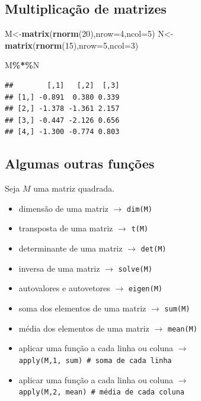 \documentclass[
]{book}
\newenvironment{Shaded}{\begin{snugshade}}{\end{snugshade}}
\newcommand{\AttributeTok}[1]{\textcolor[rgb]{0.13,0.29,0.53}{#1}}
\newcommand{\DecValTok}[1]{\textcolor[rgb]{0.00,0.00,0.81}{#1}}
\newcommand{\FunctionTok}[1]{\textcolor[rgb]{0.13,0.29,0.53}{\textbf{#1}}}
\newcommand{\NormalTok}[1]{#1}
\newcommand{\OtherTok}[1]{\textcolor[rgb]{0.56,0.35,0.01}{#1}}
\newcommand{\SpecialCharTok}[1]{\textcolor[rgb]{0.81,0.36,0.00}{\textbf{#1}}}
\begin{document}
\subsection{Multiplicação de matrizes}\label{multiplicauxe7uxe3o-de-matrizes}

\begin{Shaded}
\begin{Highlighting}[]
\NormalTok{M}\OtherTok{\textless{}{-}}\FunctionTok{matrix}\NormalTok{(}\FunctionTok{rnorm}\NormalTok{(}\DecValTok{20}\NormalTok{),}\AttributeTok{nrow=}\DecValTok{4}\NormalTok{,}\AttributeTok{ncol=}\DecValTok{5}\NormalTok{)}
\NormalTok{N}\OtherTok{\textless{}{-}}\FunctionTok{matrix}\NormalTok{(}\FunctionTok{rnorm}\NormalTok{(}\DecValTok{15}\NormalTok{),}\AttributeTok{nrow=}\DecValTok{5}\NormalTok{,}\AttributeTok{ncol=}\DecValTok{3}\NormalTok{)}

\NormalTok{M}\SpecialCharTok{\%*\%}\NormalTok{N}
\end{Highlighting}
\end{Shaded}

\begin{verbatim}
##        [,1]   [,2]  [,3]
## [1,] -0.891  0.380 0.339
## [2,] -1.378 -1.361 2.157
## [3,] -0.447 -2.126 0.656
## [4,] -1.300 -0.774 0.803
\end{verbatim}

\subsection{Algumas outras funções}\label{algumas-outras-funuxe7uxf5es}

Seja \(M\) uma matriz quadrada.

\begin{itemize}
\item
  dimensão de uma matriz \(\to\) \texttt{dim(M)}
\item
  transposta de uma matriz \(\to\) \texttt{t(M)}
\item
  determinante de uma matriz \(\to\) \texttt{det(M)}
\item
  inversa de uma matriz \(\to\) \texttt{solve(M)}
\item
  autovalores e autovetores \(\to\) \texttt{eigen(M)}
\item
  soma dos elementos de uma matriz \(\to\) \texttt{sum(M)}
\item
  média dos elementos de uma matriz \(\to\) \texttt{mean(M)}
\item
  aplicar uma função a cada linha ou coluna \(\to\) \texttt{apply(M,1,\ sum)\ \#\ soma\ de\ cada\ linha}
\item
  aplicar uma função a cada linha ou coluna \(\to\) \texttt{apply(M,2,\ mean)\ \#\ média\ de\ cada\ coluna}
\end{itemize}
\end{document}
